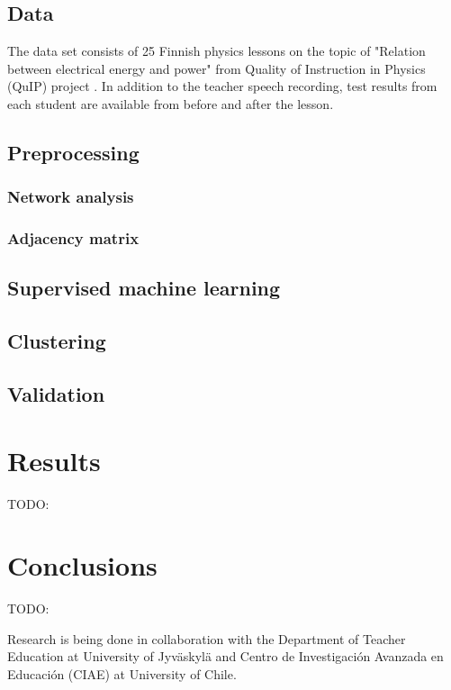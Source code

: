 \documentclass[utf8,english]{gradu3}
\begin{document}
\section{Data}
The data set consists of 25 Finnish physics lessons on the topic of "Relation between electrical energy and power" from Quality of Instruction in Physics (QuIP) project \parencite{helaakoski20146}. In addition to the teacher speech recording, test results from each student are available from before and after the lesson. 

\section{Preprocessing}
\subsection{Network analysis}
\subsection{Adjacency matrix}
\section{Supervised machine learning}
\section{Clustering}
\section{Validation}


\chapter{Results}

TODO:
\chapter{Conclusions}
TODO:

Research is being done in collaboration with the Department of Teacher Education at University of Jyväskylä and Centro de Investigación Avanzada en Educación (CIAE) at University of Chile.
 
\printbibliography
\end{document}
